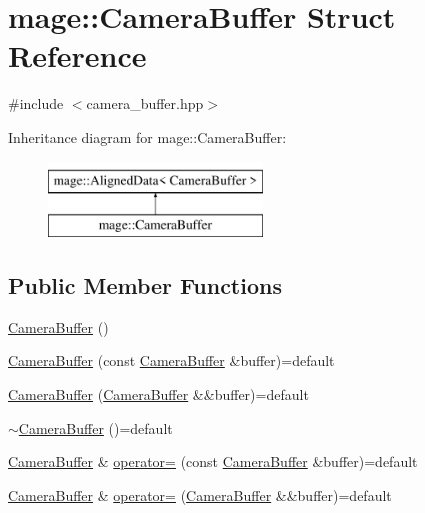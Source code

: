 \hypertarget{structmage_1_1_camera_buffer}{}\section{mage\+:\+:Camera\+Buffer Struct Reference}
\label{structmage_1_1_camera_buffer}


{\ttfamily \#include $<$camera\+\_\+buffer.\+hpp$>$}

Inheritance diagram for mage\+:\+:Camera\+Buffer\+:\begin{figure}[H]
\begin{center}
\leavevmode
\includegraphics[height=2.000000cm]{structmage_1_1_camera_buffer}
\end{center}
\end{figure}
\subsection*{Public Member Functions}
\begin{DoxyCompactItemize}
\item 
\hyperlink{structmage_1_1_camera_buffer_aca0a689a43c84fdc02e72d792b1a0ab3}{Camera\+Buffer} ()
\item 
\hyperlink{structmage_1_1_camera_buffer_a4677e0eeb321f52a6f0160c7265186a3}{Camera\+Buffer} (const \hyperlink{structmage_1_1_camera_buffer}{Camera\+Buffer} \&buffer)=default
\item 
\hyperlink{structmage_1_1_camera_buffer_a9ed685bdafbdc4b87546c082588f07c3}{Camera\+Buffer} (\hyperlink{structmage_1_1_camera_buffer}{Camera\+Buffer} \&\&buffer)=default
\item 
\hyperlink{structmage_1_1_camera_buffer_a893ff21cfa017537ccd91dd816715701}{$\sim$\+Camera\+Buffer} ()=default
\item 
\hyperlink{structmage_1_1_camera_buffer}{Camera\+Buffer} \& \hyperlink{structmage_1_1_camera_buffer_a4c2f048e1c441ae147455722d9cd4af7}{operator=} (const \hyperlink{structmage_1_1_camera_buffer}{Camera\+Buffer} \&buffer)=default
\item 
\hyperlink{structmage_1_1_camera_buffer}{Camera\+Buffer} \& \hyperlink{structmage_1_1_camera_buffer_a901081932ab76c9bdfacb0814e821190}{operator=} (\hyperlink{structmage_1_1_camera_buffer}{Camera\+Buffer} \&\&buffer)=default
\end{DoxyCompactItemize}
